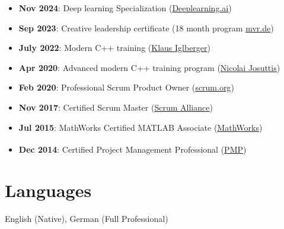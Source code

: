 \documentclass[10pt,a4paper]{article}
\begin{document}
\begin{itemize}
    \item \textbf{Nov 2024}: Deep learning Specialization (\href{https://www.deeplearning.ai}{Deeplearning.ai})
    \item \textbf{Sep 2023}: Creative leadership certificate (18 month program \href{https://mvr.de}{mvr.de})
    \item \textbf{July 2022}: Modern C++ training (\href{https://klaus-iglberger.com}{Klaus Iglberger})
    \item \textbf{Apr 2020}: Advanced modern C++ training program (\href{https://nicolaijosuttis.com}{Nicolai Josuttis})
    \item \textbf{Feb 2020}: Professional Scrum Product Owner (\href{https://scrum.org}{scrum.org})
    \item \textbf{Nov 2017}: Certified Scrum Master (\href{https://scrumalliance.org}{Scrum Alliance})
    \item \textbf{Jul 2015}: MathWorks Certified MATLAB Associate (\href{https://www.mathworks.com}{MathWorks})
    \item \textbf{Dec 2014}: Certified Project Management Professional (\href{https://www.pmi.org}{PMP}\textsuperscript{\textregistered})
\end{itemize}

\vspace{1.2em}


\section*{Languages}
English (Native), German (Full Professional)
\end{document}
